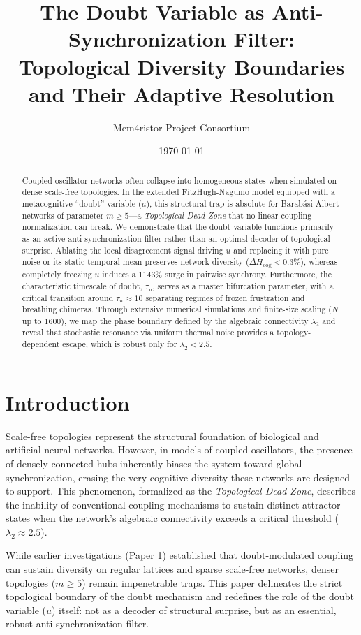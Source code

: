 \documentclass[11pt,a4paper]{article}
\title{The Doubt Variable as Anti-Synchronization Filter:\\Topological Diversity Boundaries and Their Adaptive Resolution}
\author{Mem4ristor Project Consortium}
\date{\today}
\begin{document}
\maketitle

\begin{abstract}
Coupled oscillator networks often collapse into homogeneous states when simulated on dense scale-free topologies. In the extended FitzHugh-Nagumo model equipped with a metacognitive ``doubt'' variable ($u$), this structural trap is absolute for Barab\'asi-Albert networks of parameter $m \geq 5$---a \emph{Topological Dead Zone} that no linear coupling normalization can break. We demonstrate that the doubt variable functions primarily as an active anti-synchronization filter rather than an optimal decoder of topological surprise. Ablating the local disagreement signal driving $u$ and replacing it with pure noise or its static temporal mean preserves network diversity ($\Delta H_{\mathrm{cog}} < 0.3\%$), whereas completely freezing $u$ induces a $1143\%$ surge in pairwise synchrony. Furthermore, the characteristic timescale of doubt, $\tau_u$, serves as a master bifurcation parameter, with a critical transition around $\tau_u \approx 10$ separating regimes of frozen frustration and breathing chimeras. Through extensive numerical simulations and finite-size scaling ($N$ up to $1600$), we map the phase boundary defined by the algebraic connectivity $\lambda_2$ and reveal that stochastic resonance via uniform thermal noise provides a topology-dependent escape, which is robust only for $\lambda_2 < 2.5$.
\end{abstract}

\section{Introduction}
\label{sec:intro}
Scale-free topologies represent the structural foundation of biological and artificial neural networks. However, in models of coupled oscillators, the presence of densely connected hubs inherently biases the system toward global synchronization, erasing the very cognitive diversity these networks are designed to support. This phenomenon, formalized as the \textit{Topological Dead Zone}, describes the inability of conventional coupling mechanisms to sustain distinct attractor states when the network's algebraic connectivity exceeds a critical threshold ($\lambda_2 \approx 2.5$). 

While earlier investigations (Paper 1) established that doubt-modulated coupling can sustain diversity on regular lattices and sparse scale-free networks, denser topologies ($m \geq 5$) remain impenetrable traps. This paper delineates the strict topological boundary of the doubt mechanism and redefines the role of the doubt variable ($u$) itself: not as a decoder of structural surprise, but as an essential, robust anti-synchronization filter.
\end{document}
